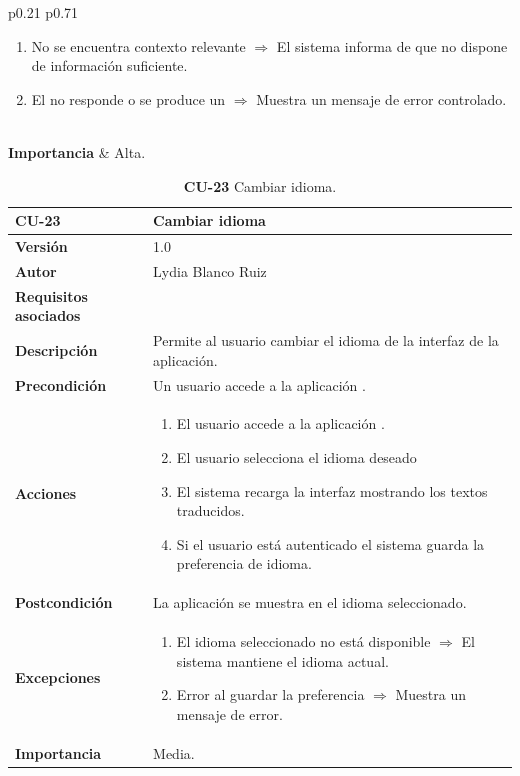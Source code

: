 \begin{table}[p]
\begin{tabularx}{\linewidth}{ p{0.21\columnwidth} p{0.71\columnwidth} }
\begin{enumerate}
			\item No se encuentra contexto relevante $\Rightarrow$ El sistema informa de que no dispone de información suficiente.
			\item El  no responde o se produce un  $\Rightarrow$ Muestra un mensaje de error controlado.
		\end{enumerate}\\
		\textbf{Importancia}          & Alta.  \\
		\bottomrule
	\end{tabularx}
	\caption{\textbf{CU-22} Realizar consulta guiada.}
	\label{req-22}
\end{table}

\begin{table}[p]
	\centering
	\begin{tabularx}{\linewidth}{ p{} p{} }
		\toprule
		\textbf{\textbf{CU-23}}    & \textbf{ Cambiar idioma}\\
		\toprule
		\textbf{Versión}              & 1.0    \\
		\textbf{Autor}                & Lydia Blanco Ruiz \\
		\textbf{Requisitos asociados} & {RNF-16} \\
		\textbf{Descripción}          & Permite al usuario cambiar el idioma de la interfaz de la aplicación. \\
		\textbf{Precondición}         & Un usuario accede a la aplicación \eng{web}. \\
		\textbf{Acciones}             &
		\begin{enumerate}
			\def\labelenumi{\arabic{enumi}.}
			\tightlist
			\item El usuario accede a la aplicación \eng{web}.
			\item El usuario selecciona el idioma deseado
			\item El sistema recarga la interfaz mostrando los textos traducidos.
			\item Si el usuario está autenticado el sistema guarda la preferencia de idioma.
		\end{enumerate}\\
		\textbf{Postcondición}        & La aplicación se muestra en el idioma seleccionado. \\
		\textbf{Excepciones}          & 
		\begin{enumerate}
			\def\labelenumi{\arabic{enumi}.}
			\tightlist
			\item El idioma seleccionado no está disponible $\Rightarrow$ El sistema mantiene el idioma actual.
			\item Error al guardar la preferencia $\Rightarrow$ Muestra un mensaje de error.
		\end{enumerate}\\
		\textbf{Importancia}          & Media.  \\
		\bottomrule
	\end{tabularx}
	\caption{\textbf{CU-23} Cambiar idioma.}
	\label{req-23}
\end{table}

